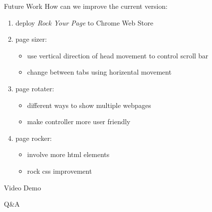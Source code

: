 \documentclass{beamer}
\begin{document}

\begin{frame}{Future Work}
How can we improve the current version:
\begin{enumerate}
    \item deploy \emph{Rock Your Page} to Chrome Web Store
    \item page sizer:
        \begin{itemize}
            \item use vertical direction of head movement to control scroll bar
            \item change between tabs using horizental movement
        \end{itemize}
    \item page rotater:
        \begin{itemize}
            \item different ways to show multiple webpages
            \item make controller more user friendly
        \end{itemize}
    \item page rocker:
        \begin{itemize}
            \item involve more html elements
            \item rock css improvement
        \end{itemize}
\end{enumerate}
\end{frame}

\begin{frame}
\begin{center}
    \Huge{Video Demo}
\end{center}
\end{frame}

\begin{frame}
\begin{center}
    \Huge{Q\&A}
\end{center}
\end{frame}
\end{document}
